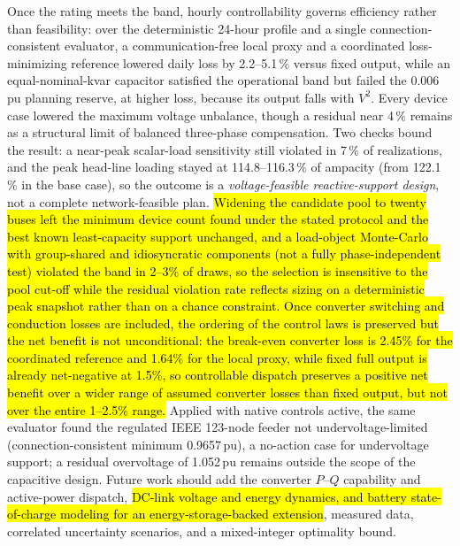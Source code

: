 \documentclass{ieeeaccess}
\newcommand{\rev}[1]{{\color{red}\hl{#1}}}
\newcommand{\rev}[1]{#1}
\providecommand{\percent}{\%}
\newcommand{\SI}[2]{#1\,\ensuremath{\mathrm{#2}}}
\newcommand{\SIrange}[3]{#1\mbox{--}#2\,\ensuremath{\mathrm{#3}}}
\begin{document}
Once the rating meets the band, hourly controllability governs efficiency rather than
feasibility: over the deterministic 24-hour profile and a single connection-consistent
evaluator, a communication-free local proxy and a coordinated loss-minimizing
reference lowered daily loss by \SIrange{2.2}{5.1}{\percent} versus fixed output,
while an equal-nominal-kvar capacitor satisfied the operational band but failed the
\SI{0.006}{pu} planning reserve, at higher loss, because its output falls with
$V^2$. Every device case lowered the maximum voltage unbalance, though a residual near
\SI{4}{\percent} remains as a structural limit of balanced three-phase compensation.
Two checks bound the result: a near-peak scalar-load sensitivity still violated in
\SI{7}{\percent} of realizations, and the peak head-line loading stayed at
\SIrange{114.8}{116.3}{\percent} of ampacity (from \SI{122.1}{\percent} in the base
case), so the outcome is a \emph{voltage-feasible reactive-support design}, not a
complete network-feasible plan. \rev{Widening the candidate pool to twenty buses
left the minimum device count found under the stated protocol and the best known
least-capacity support unchanged, and a load-object Monte-Carlo with group-shared and
idiosyncratic components (not a fully phase-independent test) violated the band in
\mbox{2--3\%} of draws, so the selection is insensitive to the pool cut-off while the residual
violation rate reflects sizing on a deterministic peak snapshot rather than on a
chance constraint. Once converter switching and conduction losses are included, the
ordering of the control laws is preserved but the net benefit is not unconditional:
the break-even converter loss is \mbox{2.45\%} for the coordinated reference and
\mbox{1.64\%} for the local proxy, while fixed full output is already net-negative at
\mbox{1.5\%}, so controllable dispatch preserves a positive net benefit over a wider
range of assumed converter losses than fixed output, but not over the entire
\mbox{1--2.5\%} range.} Applied with native controls active, the same
evaluator found the regulated IEEE 123-node feeder not undervoltage-limited
(connection-consistent minimum \SI{0.9657}{pu}), a no-action case for undervoltage
support; a residual overvoltage of \SI{1.052}{pu} remains outside the scope of the
capacitive design. Future
work should add the converter $P$--$Q$ capability and active-power dispatch,
\rev{DC-link voltage and energy dynamics, and battery state-of-charge modeling for an
energy-storage-backed extension}, measured data, correlated uncertainty scenarios, and a
mixed-integer optimality bound.
\end{document}
